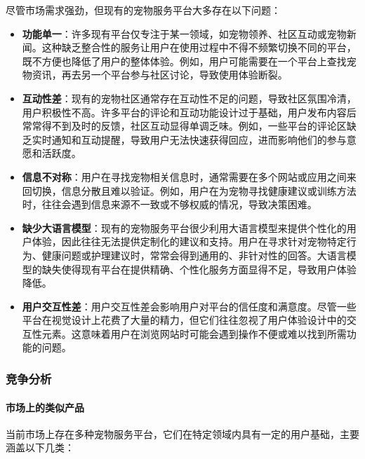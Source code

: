 尽管市场需求强劲，但现有的宠物服务平台大多存在以下问题：

\begin{itemize}
    \item \textbf{功能单一}：许多现有平台仅专注于某一领域，如宠物领养、社区互动或宠物新闻。这种缺乏整合性的服务让用户在使用过程中不得不频繁切换不同的平台，既不方便也降低了用户的整体体验。例如，用户可能需要在一个平台上查找宠物资讯，再去另一个平台参与社区讨论，导致使用体验断裂。
    \item \textbf{互动性差}：现有的宠物社区通常存在互动性不足的问题，导致社区氛围冷清，用户积极性不高。许多平台的评论和互动功能设计过于基础，用户发布内容后常常得不到及时的反馈，社区互动显得单调乏味。例如，一些平台的评论区缺乏实时通知和互动提醒，导致用户无法快速获得回应，进而影响他们的参与意愿和活跃度。
    \item \textbf{信息不对称}：用户在寻找宠物相关信息时，通常需要在多个网站或应用之间来回切换，信息分散且难以验证。例如，用户在为宠物寻找健康建议或训练方法时，往往会遇到信息来源不一致或不够权威的情况，导致决策困难。
    \item \textbf{缺少大语言模型}：现有的宠物服务平台很少利用大语言模型来提供个性化的用户体验，因此往往无法提供定制化的建议和支持。用户在寻求针对宠物特定行为、健康问题或护理建议时，常常会得到通用的、非针对性的回答。大语言模型的缺失使得现有平台在提供精确、个性化服务方面显得不足，导致用户体验降低。
    \item \textbf{用户交互性差}：用户交互性差会影响用户对平台的信任度和满意度。尽管一些平台在视觉设计上花费了大量的精力，但它们往往忽视了用户体验设计中的交互性元素。这意味着用户在浏览网站时可能会遇到操作不便或难以找到所需功能的问题。
\end{itemize}

\subsubsection{竞争分析}

\paragraph{市场上的类似产品}

当前市场上存在多种宠物服务平台，它们在特定领域内具有一定的用户基础，主要涵盖以下几类：

